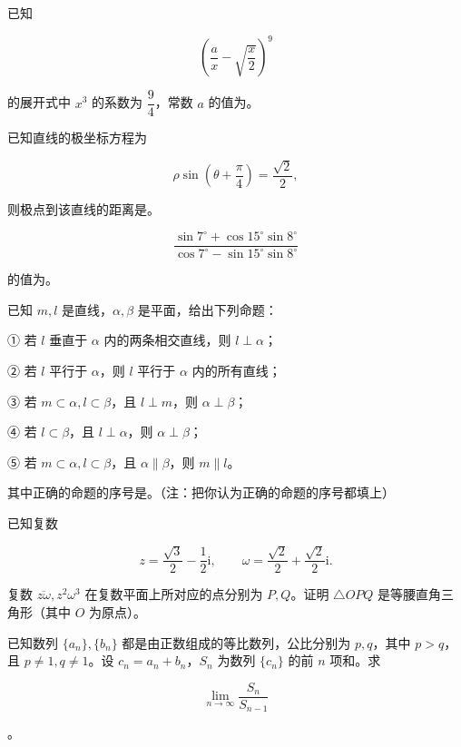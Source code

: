 \begin{question}
已知

\nopagebreak[4]
\[
\left(\dfrac ax-\sqrt{\dfrac x2}\right)^9
\]

的展开式中 $x^3$ 的系数为 $\dfrac94$，常数 $a$ 的值为\gkblank{}。

\end{question}
\begin{question}
已知直线的极坐标方程为

\nopagebreak[4]
\[
\rho\sin\left(\theta+\dfrac\pi4\right)=\dfrac{\sqrt2}{2},
\]

则极点到该直线的距离是\gkblank{}。

\end{question}
\begin{question}

\nopagebreak[4]
\[
\dfrac{\sin7^\circ+\cos15^\circ\sin8^\circ}
{\cos7^\circ-\sin15^\circ\sin8^\circ}
\]

的值为\gkblank{}。

\end{question}
\begin{question}
已知 $m,l$ 是直线，$\alpha,\beta$ 是平面，给出下列命题：

① 若 $l$ 垂直于 $\alpha$ 内的两条相交直线，则 $l\perp\alpha$；

② 若 $l$ 平行于 $\alpha$，则 $l$ 平行于 $\alpha$ 内的所有直线；

③ 若 $m\subset\alpha,l\subset\beta$，且 $l\perp m$，则 $\alpha\perp\beta$；

④ 若 $l\subset\beta$，且 $l\perp\alpha$，则 $\alpha\perp\beta$；

⑤ 若 $m\subset\alpha,l\subset\beta$，且 $\alpha\parallel\beta$，则 $m\parallel l$。

其中正确的命题的序号是\gkblank{}。（注：把你认为正确的命题的序号都填上）

\end{question}
\begin{question}
已知复数

\nopagebreak[4]
\[
z=\dfrac{\sqrt3}{2}-\dfrac12\mathrm{i},\qquad
\omega=\dfrac{\sqrt2}{2}+\dfrac{\sqrt2}{2}\mathrm{i}.
\]

复数 $\overline{z\omega},z^2\omega^3$ 在复数平面上所对应的点分别为 $P,Q$。证明 $\triangle OPQ$ 是等腰直角三角形（其中 $O$ 为原点）。

\end{question}
\begin{question}
已知数列 $\{a_n\},\{b_n\}$ 都是由正数组成的等比数列，公比分别为 $p,q$，其中 $p>q$，且 $p\neq1,q\neq1$。设 $c_n=a_n+b_n$，$S_n$ 为数列 $\{c_n\}$ 的前 $n$ 项和。求

\nopagebreak[4]
\[
\lim_{n\to\infty}\dfrac{S_n}{S_{n-1}}
\]

。

\end{question}
